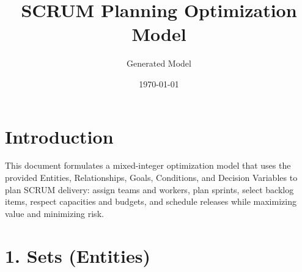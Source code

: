 \documentclass[11pt]{article}
\title{SCRUM Planning Optimization Model}
\author{Generated Model}
\date{\today}
\begin{document}
\maketitle
\tableofcontents

\section*{Introduction}
This document formulates a mixed-integer optimization model that uses the provided Entities, Relationships, Goals, Conditions, and Decision Variables to plan SCRUM delivery: assign teams and workers, plan sprints, select backlog items, respect capacities and budgets, and schedule releases while maximizing value and minimizing risk.

\section{1. Sets (Entities)}
\end{document}
